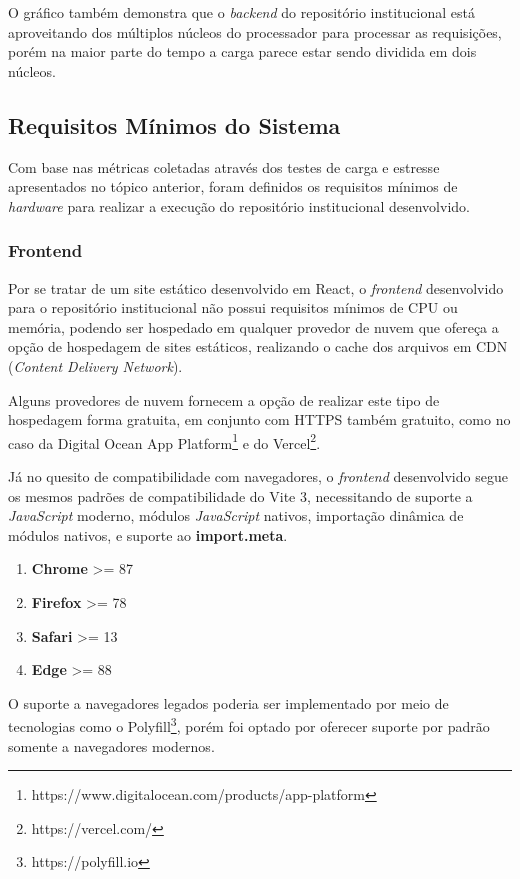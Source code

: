 O gráfico também demonstra que o \emph{backend} do repositório institucional
está aproveitando dos múltiplos núcleos do processador para processar as requisições,
porém na maior parte do tempo a carga parece estar sendo dividida em dois núcleos.

\subsection{Requisitos Mínimos do Sistema}

Com base nas métricas coletadas através dos testes de carga e estresse apresentados
no tópico anterior, foram definidos os requisitos mínimos de \emph{hardware}
para realizar a execução do repositório institucional desenvolvido.

\subsubsection{Frontend}

Por se tratar de um site estático desenvolvido em React, o \emph{frontend} desenvolvido
para o repositório institucional não possui requisitos mínimos de CPU ou memória, podendo
ser hospedado em qualquer provedor de nuvem que ofereça a opção de hospedagem de sites
estáticos, realizando o cache dos arquivos em CDN (\emph{Content Delivery Network}).

Alguns provedores de nuvem fornecem a opção de realizar este tipo de hospedagem forma
gratuita, em conjunto com HTTPS também gratuito, como no caso da Digital Ocean App Platform\footnote{https://www.digitalocean.com/products/app-platform}
e do Vercel\footnote{https://vercel.com/}.

Já no quesito de compatibilidade com navegadores, o \emph{frontend} desenvolvido segue
os mesmos padrões de compatibilidade do Vite 3, necessitando de suporte a \emph{JavaScript}
moderno, módulos \emph{JavaScript} nativos, importação dinâmica de módulos nativos,
e suporte ao \textbf{import.meta}.

\begin{enumerate}
    \item \textbf{Chrome} >= 87
    \item \textbf{Firefox} >= 78
    \item \textbf{Safari} >= 13
    \item \textbf{Edge} >= 88
\end{enumerate}

O suporte a navegadores legados poderia ser implementado por meio de
tecnologias como o Polyfill\footnote{https://polyfill.io}, porém foi
optado por oferecer suporte por padrão somente a navegadores modernos.

